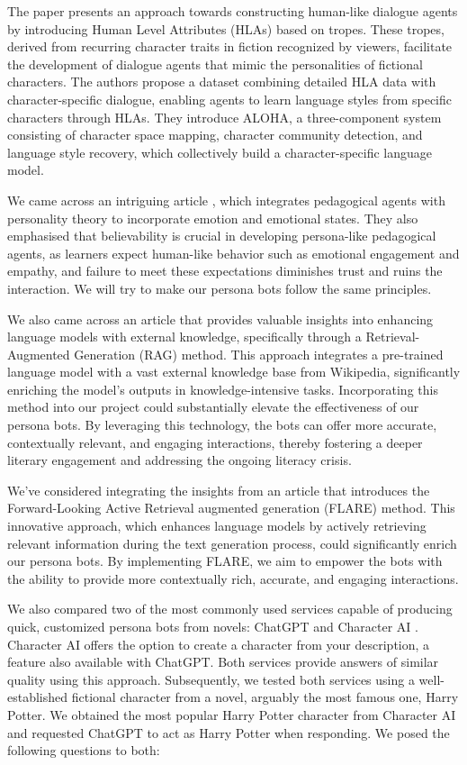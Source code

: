 \documentclass[fleqn,moreauthors,10pt]{ds_report}
\begin{document}
The paper \cite{li2019follow} presents an approach towards constructing human-like dialogue agents by introducing Human Level Attributes (HLAs) based on tropes. These tropes, derived from recurring character traits in fiction recognized by viewers, facilitate the development of dialogue agents that mimic the personalities of fictional characters. The authors propose a dataset combining detailed HLA data with character-specific dialogue, enabling agents to learn language styles from specific characters through HLAs. They introduce ALOHA, a three-component system consisting of character space mapping, character community detection, and language style recovery, which collectively build a character-specific language model. 

We came across an intriguing article \cite{paiva1999enriching}, which integrates pedagogical agents with personality theory to incorporate emotion and emotional states. They also emphasised that believability is crucial in developing persona-like pedagogical agents, as learners expect human-like behavior such as emotional engagement and empathy, and failure to meet these expectations diminishes trust and ruins the interaction. We will try to make our persona bots follow the same principles.

We also came across an article \cite{lewis2020retrieval} that provides valuable insights into enhancing language models with external knowledge, specifically through a Retrieval-Augmented Generation (RAG) method. This approach integrates a pre-trained language model with a vast external knowledge base from Wikipedia, significantly enriching the model's outputs in knowledge-intensive tasks. Incorporating this method into our project could substantially elevate the effectiveness of our persona bots. By leveraging this technology, the bots can offer more accurate, contextually relevant, and engaging interactions, thereby fostering a deeper literary engagement and addressing the ongoing literacy crisis.

We've considered integrating the insights from an article \cite{jiang2023active} that introduces the Forward-Looking Active Retrieval augmented generation (FLARE) method. This innovative approach, which enhances language models by actively retrieving relevant information during the text generation process, could significantly enrich our persona bots. By implementing FLARE, we aim to empower the bots with the ability to provide more contextually rich, accurate, and engaging interactions.

We also compared two of the most commonly used services capable of producing quick, customized persona bots from novels: ChatGPT \cite{openai2022} and Character AI \cite{characterai}. Character AI offers the option to create a character from your description, a feature also available with ChatGPT. Both services provide answers of similar quality using this approach. Subsequently, we tested both services using a well-established fictional character from a novel, arguably the most famous one, Harry Potter. We obtained the most popular Harry Potter character from Character AI \cite{characterai-chat} and requested ChatGPT to act as Harry Potter when responding. We posed the following questions to both:
\end{document}
